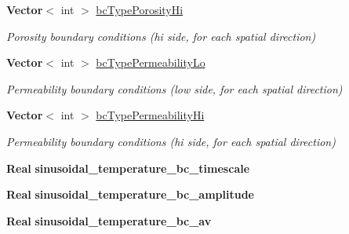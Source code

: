 \begin{DoxyCompactItemize}
\mbox{\label{class_mushy_layer_params_a0c21268e365bffc758882f01ca67bc7f}} 
\textbf{ Vector}$<$ int $>$ \hyperlink{class_mushy_layer_params_a0c21268e365bffc758882f01ca67bc7f}{bc\+Type\+Porosity\+Hi}
\begin{DoxyCompactList}\small\item\em Porosity boundary conditions (hi side, for each spatial direction) \end{DoxyCompactList}\item 
\mbox{\label{class_mushy_layer_params_a4b8ab639d783fa87bfe65eaddc2386b1}} 
\textbf{ Vector}$<$ int $>$ \hyperlink{class_mushy_layer_params_a4b8ab639d783fa87bfe65eaddc2386b1}{bc\+Type\+Permeability\+Lo}
\begin{DoxyCompactList}\small\item\em Permeability boundary conditions (low side, for each spatial direction) \end{DoxyCompactList}\item 
\mbox{\label{class_mushy_layer_params_a5b6fae7451c1f563711f732308058d0c}} 
\textbf{ Vector}$<$ int $>$ \hyperlink{class_mushy_layer_params_a5b6fae7451c1f563711f732308058d0c}{bc\+Type\+Permeability\+Hi}
\begin{DoxyCompactList}\small\item\em Permeability boundary conditions (hi side, for each spatial direction) \end{DoxyCompactList}\item 
\mbox{\label{class_mushy_layer_params_a20a1d7a413a67824498266e1477b1309}} 
\textbf{ Real} {\bfseries sinusoidal\+\_\+temperature\+\_\+bc\+\_\+timescale}
\item 
\mbox{\label{class_mushy_layer_params_a89941b4d0f3984469388df57a5268298}} 
\textbf{ Real} {\bfseries sinusoidal\+\_\+temperature\+\_\+bc\+\_\+amplitude}
\item 
\mbox{\label{class_mushy_layer_params_a5fe25e2665c1cf898731e66c5f7e9f3d}} 
\textbf{ Real} {\bfseries sinusoidal\+\_\+temperature\+\_\+bc\+\_\+av}
\item 
\mbox{\label{class_mushy_layer_params_a3ed398bb3132c12df017957640fe6db5}} 

\end{DoxyCompactItemize}
